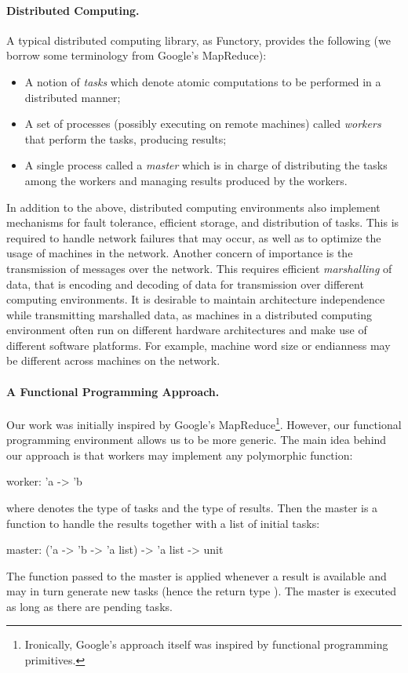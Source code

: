 \documentclass{llncs}
\newcommand{\functory}{\textsf{Functory}}
\begin{document}
\paragraph{Distributed Computing.}
A typical distributed computing library, as \functory, provides the
following (we borrow some terminology from Google's
MapReduce):
\begin{itemize}
\item A notion of \emph{tasks} which denote atomic computations
  to be performed in a distributed manner; 
\item A set of processes (possibly executing on remote machines)
  called \emph{workers} that perform
  the tasks, producing results;
\item A single process called a \emph{master} which is in charge
  of distributing the tasks among the workers and managing results
  produced by the workers.
\end{itemize}
In addition to the above, distributed computing environments also
implement mechanisms for fault tolerance, efficient storage, and
distribution of tasks. This is required to handle network failures
that may occur, as well as to optimize the usage of machines in the
network. Another concern of importance is the transmission of messages
over the network. This requires efficient 
\emph{marshalling} of data, that is encoding and decoding of data 
for transmission over different computing environments.  It is desirable to
maintain architecture independence while transmitting marshalled data,
as machines in a distributed computing environment often run on
different hardware architectures and make use of different software
platforms. For example, machine word size or endianness may be different
across machines on the network.

\paragraph{A Functional Programming Approach.}
Our work was initially inspired by Google's
MapReduce\footnote{Ironically, Google's approach itself was inspired
  by functional programming primitives.}. However, our functional
programming environment allows us to be more generic. 
The main idea behind our approach is that
workers may implement any polymorphic function:
\begin{ocaml}
  worker: 'a -> 'b
\end{ocaml}
where  denotes the type of tasks and  the type of results.
Then the master is a
function to handle the results together with
a list of initial tasks:
\begin{ocaml}
  master: ('a -> 'b -> 'a list) -> 'a list -> unit
\end{ocaml}
The function passed to the master is applied whenever a result is
available and may in turn generate new tasks (hence the return type
).  The master is executed as long as there are pending
tasks.
\end{document}
